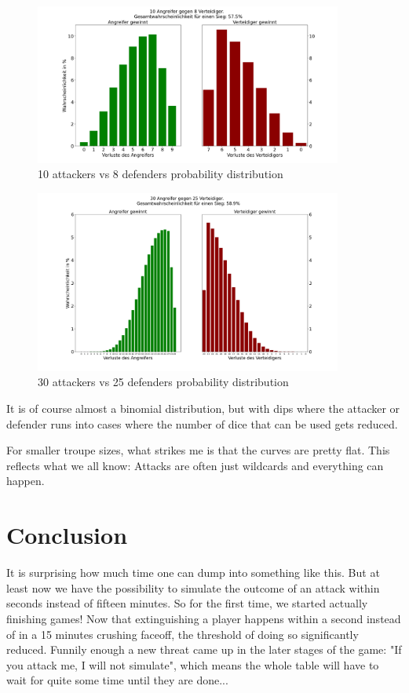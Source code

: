 \documentclass[11pt,a4paper]{article}
\begin{document}
\begin{figure}[H]
\centering
\includegraphics[width=0.9\textwidth]{../images/Risk10v8.png}
\caption{10 attackers vs 8 defenders probability distribution}
\end{figure}

\begin{figure}[H]
\centering
\includegraphics[width=0.9\textwidth]{../images/Risk30v25.png}
\caption{30 attackers vs 25 defenders probability distribution}
\end{figure}

It is of course almost a binomial distribution, but with dips where the attacker or defender runs into cases where the number of dice that can be used gets reduced.

For smaller troupe sizes, what strikes me is that the curves are pretty flat. This reflects what we all know: Attacks are often just wildcards and everything can happen.

\section{Conclusion}
It is surprising how much time one can dump into something like this. But at least now we have the possibility to simulate the outcome of an attack within seconds instead of fifteen minutes. So for the first time, we started actually finishing games! Now that extinguishing a player happens within a second instead of in a 15 minutes crushing faceoff, the threshold of doing so significantly reduced. Funnily enough a new threat came up in the later stages of the game: "If you attack me, I will not simulate", which means the whole table will have to wait for quite some time until they are done...
\end{document}
